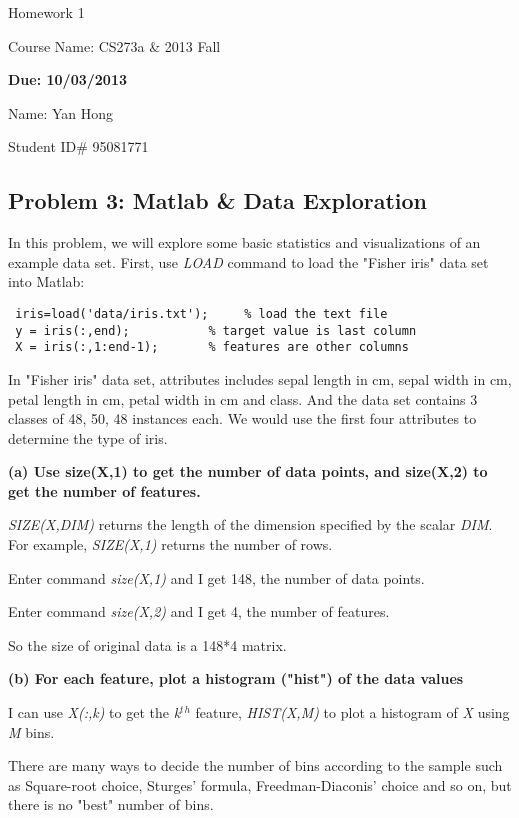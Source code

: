\documentclass[twoside,11pt]{article}
\theoremstyle{definition}
\begin{document}
\centerline{\Large Homework 1}
\centerline{Course Name: CS273a \& 2013 Fall}
\centerline{\bf Due: 10/03/2013}

\vspace{3ex}
\centerline{Name: Yan Hong}
\centerline{Student ID\# 95081771}

\subsection*{Problem 3: Matlab \& Data Exploration}
In this problem, we will explore some basic statistics and visualizations of an example data set.
First, use \textit{LOAD} command to load the "Fisher iris" data set into Matlab:
\begin{lstlisting}
 iris=load('data/iris.txt');     % load the text file
 y = iris(:,end);           % target value is last column
 X = iris(:,1:end-1);       % features are other columns
\end{lstlisting}

In "Fisher iris" data set, attributes includes sepal length in cm, sepal width in cm, petal length in cm, petal width in cm and class. And the data set contains 3 classes of 48, 50, 48 instances each. We would use the first four attributes to determine the type of iris.

\vspace{3ex}
\textbf{(a) Use size(X,1) to get the number of data points, and size(X,2) to get the number of features.}

\textit{SIZE(X,DIM)} returns the length of the dimension specified by the scalar \textit{DIM}.  For example, \textit{SIZE(X,1)} returns the number of rows.

Enter command \textit{size(X,1)} and I get 148, the number of data points.

Enter command \textit{size(X,2)} and I get 4, the number of features.

So the size of original data is a 148*4 matrix.

\vspace{3ex}
\textbf{(b) For each feature, plot a histogram ("hist") of the data values}

I can use \textit{X(:,k)} to get the \textit{k$^t$$^h$} feature, \textit{HIST(X,M)} to plot a histogram of \textit{X} using \textit{M} bins.

There are many ways to decide the number of bins according to the sample such as Square-root choice, Sturges' formula, Freedman-Diaconis' choice and so on, but there is no "best" number of bins.
\end{document}

